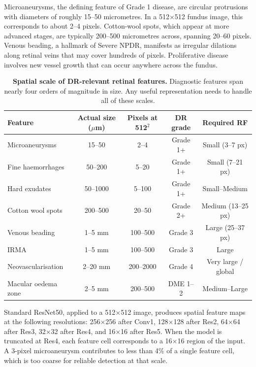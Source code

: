 \documentclass[12pt,a4paper]{article}
\begin{document}
Microaneurysms, the defining feature of Grade 1 disease, are circular protrusions with diameters of roughly 15--50 micrometres. In a 512$\times$512 fundus image, this corresponds to about 2--4 pixels. Cotton-wool spots, which appear at more advanced stages, are typically 200--500 micrometres across, spanning 20--60 pixels. Venous beading, a hallmark of Severe NPDR, manifests as irregular dilations along retinal veins that may cover hundreds of pixels. Proliferative disease involves new vessel growth that can occur anywhere across the fundus.

\begin{table}[H]
\centering
\small
\caption{\textbf{Spatial scale of DR-relevant retinal features.} Diagnostic features span nearly four orders of magnitude in size. Any useful representation needs to handle all of these scales.}
\begin{tabular}{|l|c|c|c|c|}
\hline
\textbf{Feature} & \textbf{Actual size ($\mu$m)} & \textbf{Pixels at 512$^2$} & \textbf{DR grade} & \textbf{Required RF} \\
\hline
Microaneurysms & 15--50 & 2--4 & Grade 1+ & Small (3--7 px) \\
Fine haemorrhages & 50--200 & 5--20 & Grade 1+ & Small (7--21 px) \\
Hard exudates & 50--1000 & 5--100 & Grade 1+ & Small--Medium \\
Cotton wool spots & 200--500 & 20--50 & Grade 2+ & Medium (13--25 px) \\
Venous beading & 1--5 mm & 100--500 & Grade 3 & Large (25--37 px) \\
IRMA & 1--5 mm & 100--500 & Grade 3 & Large \\
Neovascularisation & 2--20 mm & 200--2000 & Grade 4 & Very large / global \\
Macular oedema zone & 2--5 mm & 200--500 & DME 1--2 & Medium--Large \\
\hline
\end{tabular}
\end{table}

Standard ResNet50, applied to a 512$\times$512 image, produces spatial feature maps at the following resolutions: 256$\times$256 after Conv1, 128$\times$128 after Res2, 64$\times$64 after Res3, 32$\times$32 after Res4, and 16$\times$16 after Res5. When the model is truncated at Res4, each feature cell corresponds to a 16$\times$16 region of the input. A 3-pixel microaneurysm contributes to less than 4\% of a single feature cell, which is too coarse for reliable detection at that scale.
\end{document}
